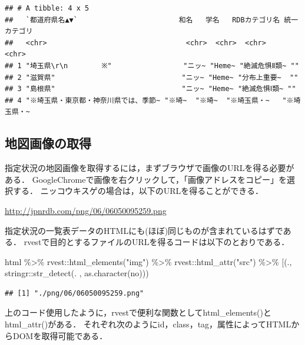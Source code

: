 \documentclass[
]{article}
\newenvironment{Shaded}{\begin{snugshade}}{\end{snugshade}}
\newcommand{\AttributeTok}[1]{\textcolor[rgb]{0.77,0.63,0.00}{#1}}
\newcommand{\FunctionTok}[1]{\textcolor[rgb]{0.00,0.00,0.00}{#1}}
\newcommand{\NormalTok}[1]{#1}
\newcommand{\SpecialCharTok}[1]{\textcolor[rgb]{0.00,0.00,0.00}{#1}}
\newcommand{\StringTok}[1]{\textcolor[rgb]{0.31,0.60,0.02}{#1}}
\begin{document}
\begin{verbatim}
## # A tibble: 4 x 5
##   `都道府県名▲▼`                        和名   学名   RDBカテゴリ名 統一カテゴリ
##   <chr>                                 <chr>  <chr>  <chr>         <chr>       
## 1 "埼玉県\r\n        ※"                 "ニッ~ "Heme~ "絶滅危惧Ⅱ類~ ""          
## 2 "滋賀県"                              "ニッ~ "Heme~ "分布上重要~  ""          
## 3 "島根県"                              "ニッ~ "Heme~ "絶滅危惧Ⅰ類~ ""          
## 4 "※埼玉県・東京都・神奈川県では、季節~ "※埼~  "※埼~  "※埼玉県・~   "※埼玉県・~
\end{verbatim}

\hypertarget{ux5730ux56f3ux753bux50cfux306eux53d6ux5f97}{%
\subsection{地図画像の取得}\label{ux5730ux56f3ux753bux50cfux306eux53d6ux5f97}}

指定状況の地図画像を取得するには，まずブラウザで画像のURLを得る必要がある．
GoogleChromeで画像を右クリックして，「画像アドレスをコピー」を選択する．
ニッコウキスゲの場合は，以下のURLを得ることができる．

\url{http://jpnrdb.com/png/06/06050095259.png}

指定状況の一覧表データのHTMLにも(ほぼ)同じものが含まれているはずである．
rvestで目的とするファイルのURLを得るコードは以下のとおりである．

\begin{Shaded}
\begin{Highlighting}[]
\NormalTok{html }\SpecialCharTok{\%\textgreater{}\%}
\NormalTok{  rvest}\SpecialCharTok{::}\FunctionTok{html\_elements}\NormalTok{(}\StringTok{"img"}\NormalTok{) }\SpecialCharTok{\%\textgreater{}\%}
\NormalTok{  rvest}\SpecialCharTok{::}\FunctionTok{html\_attr}\NormalTok{(}\StringTok{"src"}\NormalTok{) }\SpecialCharTok{\%\textgreater{}\%}
  \StringTok{\textasciigrave{}}\AttributeTok{[}\StringTok{\textasciigrave{}}\NormalTok{(., stringr}\SpecialCharTok{::}\FunctionTok{str\_detect}\NormalTok{(. , }\FunctionTok{as.character}\NormalTok{(no)))}
\end{Highlighting}
\end{Shaded}

\begin{verbatim}
## [1] "./png/06/06050095259.png"
\end{verbatim}

上のコード使用したように，rvestで便利な関数としてhtml\_elements()とhtml\_attr()がある．
それぞれ次のようにid，class，tag，属性によってHTMLからDOMを取得可能である．
\end{document}
